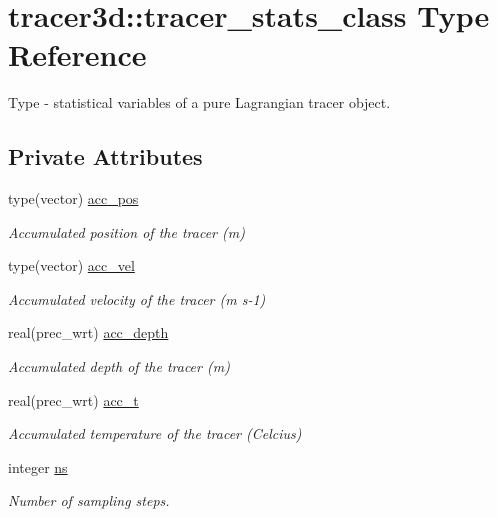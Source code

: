 \hypertarget{structtracer3d_1_1tracer__stats__class}{}\section{tracer3d\+:\+:tracer\+\_\+stats\+\_\+class Type Reference}
\label{structtracer3d_1_1tracer__stats__class}


Type -\/ statistical variables of a pure Lagrangian tracer object.  


\subsection*{Private Attributes}
\begin{DoxyCompactItemize}
\item 
type(vector) \mbox{\hyperlink{structtracer3d_1_1tracer__stats__class_a1a9df2788c632bb2dcba4e303dc83e78}{acc\+\_\+pos}}
\begin{DoxyCompactList}\small\item\em Accumulated position of the tracer (m) \end{DoxyCompactList}\item 
type(vector) \mbox{\hyperlink{structtracer3d_1_1tracer__stats__class_a623f27a49b6e37a3e5c21b8bab55a323}{acc\+\_\+vel}}
\begin{DoxyCompactList}\small\item\em Accumulated velocity of the tracer (m s-\/1) \end{DoxyCompactList}\item 
real(prec\+\_\+wrt) \mbox{\hyperlink{structtracer3d_1_1tracer__stats__class_af9e6304d89967e9ade6b1188101391b6}{acc\+\_\+depth}}
\begin{DoxyCompactList}\small\item\em Accumulated depth of the tracer (m) \end{DoxyCompactList}\item 
real(prec\+\_\+wrt) \mbox{\hyperlink{structtracer3d_1_1tracer__stats__class_acdca78550575d7690eb26482ed75aeef}{acc\+\_\+t}}
\begin{DoxyCompactList}\small\item\em Accumulated temperature of the tracer (Celcius) \end{DoxyCompactList}\item 
integer \mbox{\hyperlink{structtracer3d_1_1tracer__stats__class_a0a07132ada5734cd6f132bc9ffd327b2}{ns}}
\begin{DoxyCompactList}\small\item\em Number of sampling steps. \end{DoxyCompactList}\end{DoxyCompactItemize}


